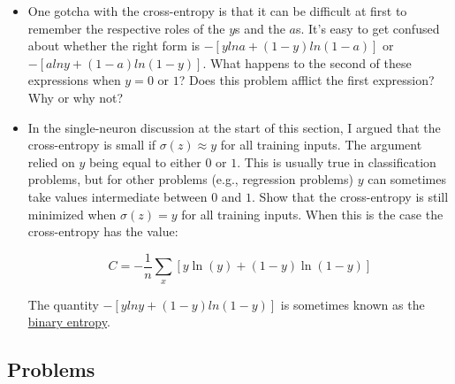 \documentclass[a4paper,11pt,twoside]{report}
\begin{document}
\begin{itemize}
\item One gotcha with the cross-entropy is that it can be difficult at first to remember the respective roles of the $y$s and the $a$s. It's easy to get confused about whether the right form is $-[ylna+(1-y)ln(1-a)]$ or $-[alny+(1-a)ln(1-y)]$. What happens to the second of these expressions when $y=0$ or $1$? Does this problem afflict the first expression? Why or why not?

\item In the single-neuron discussion at the start of this section, I argued that the cross-entropy is small if $\sigma(z)\approx y$ for all training inputs. The argument relied on $y$ being equal to either $0$ or $1$. This is usually true in classification problems, but for other problems (e.g., regression problems) $y$ can sometimes take values intermediate between $0$ and $1$. Show that the cross-entropy is still minimized when $\sigma(z)=y$ for all training inputs. When this is the case the cross-entropy has the value:

\begin{equation}
C=-\frac{1}{n}\sum_x \left[y \ln(y) +(1-y)\ln (1-y)\right]
\label{eq: cost cross-entropy for a=y}
\end{equation}

The quantity $-[ylny+(1-y)ln(1-y)]$ is sometimes known as the \href{https://en.wikipedia.org/wiki/Binary_entropy_function}{binary entropy}.
\end{itemize}


\subsection*{Problems}
\label{Problems: many-layer multi-neuron network}
\end{document}
